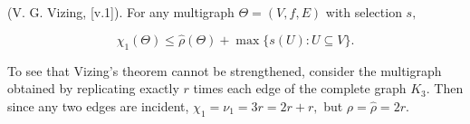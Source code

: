 (V. G. Vizing, [v.1]). For any multigraph $\Theta = (V, f, E)$ with selection $s,$

$$\chi_1(\Theta) \leq \hat{\rho}(\Theta) + \max\{s(U): U \subseteq V\}.$$

To see that Vizing’s theorem cannot be strengthened, consider the multigraph obtained by replicating exactly $r$ times each edge of the complete graph $K_3$. Then since any two edges are incident, $\chi_1 = \nu_1 = 3r = 2r + r,$ but $\rho = \hat{\rho} = 2r.$

